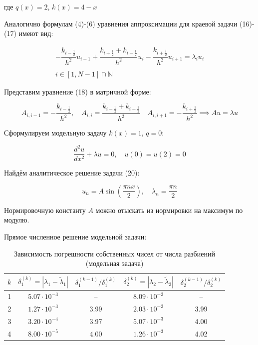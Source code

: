 \documentclass[a4paper,12pt]{article}
\begin{document}
	\begin{center}
		где $q(x) = 2$, $k(x) = 4-x$
	\end{center}
	
	\quad Аналогично формулам (4)-(6) уравнения аппроксимации для краевой задачи (16)-(17) имеют вид:
	
	\begin{equation}
		\begin{array}{c}
			-\dfrac{k_{i-\frac{1}{2}}}{h^2} u_{i-1} + \dfrac{k_{i+\frac{1}{2}} + k_{i-\frac{1}{2}}}{h^2} u_i - \dfrac{k_{i+\frac{i}{2}}}{h^2} u_{i+1} = \lambda_{i} u_{i} \\
			\\
			i \in [1, N-1] \cap \mathbb{N}
		\end{array}
	\end{equation}
	
	\quad Представим уравнение (18) в матричной форме:
	
	\begin{equation}
		A_{i, i-1} = -\dfrac{k_{i-\frac{1}{2}}}{h^2}, \quad A_{i, i} = \dfrac{k_{i-\frac{1}{2}} + k_{i+\frac{1}{2}}}{h^2} \quad A_{i, i+1} = -\dfrac{k_{i+\frac{1}{2}}}{h^2} \implies A u = \lambda u
	\end{equation}
	
	\quad Сформулируем модельную задачу $k(x) = 1$, $q = 0$:
	
	\begin{equation}
		\dfrac{d^2 u}{dx^2} + \lambda u = 0, \quad u(0) = u(2) = 0
	\end{equation}
	
	\quad Найдём аналитическое решение задачи (20): 
	
	\begin{equation}
		u_n = A \sin\left(\dfrac{\pi n x}{2}\right), \quad \lambda_n = \dfrac{\pi n}{2}	
	\end{equation}
	
	\quad Нормировочную константу $A$ можно отыскать из нормировки на максимум по модулю. 
	
	\quad Прямое численное решение модельной задачи: 
	
	\begin{table}[H]
		\centering
		\caption{Зависимость погрешности собственных чисел от числа разбиений (модельная задача)}
		\label{tab:eigen_model_lambda}
		\begin{tabular}{|c|c|c|c|c|}
			\hline
			$k$ & $\delta_1^{(k)} = |\lambda_1 - \tilde{\lambda}_1|$ & $\delta_1^{(k-1)} / \delta_1^{(k)}$ & $\delta_2^{(k)} = |\lambda_2 - \tilde{\lambda}_2|$ & $\delta_2^{(k-1)} / \delta_2^{(k)}$ \\
			\hline
			1 & $5.07 \cdot 10^{-3}$ & -- & $8.09 \cdot 10^{-2}$ & -- \\
			\hline
			2 & $1.27 \cdot 10^{-3}$ & 3.99 & $2.03 \cdot 10^{-2}$ & 3.99 \\
			\hline
			3 & $3.20 \cdot 10^{-4}$ & 3.97 & $5.07 \cdot 10^{-3}$ & 4.00 \\
			\hline
			4 & $8.00 \cdot 10^{-5}$ & 4.00 & $1.26 \cdot 10^{-3}$ & 4.02 \\
			\hline
		\end{tabular}
	\end{table}
	
\end{document}
